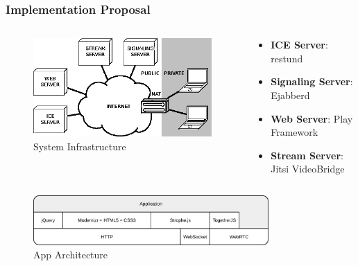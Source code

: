 \documentclass[compress]{beamer}
\begin{document}
		\begin{frame}[c]
		\frametitle{Implementation Proposal}


\begin{columns}[c]
\begin{column}{.4\textwidth}
		\begin{figure}[H]
			\includegraphics[width=\textwidth]{figures/arch.png}
			\caption{System Infrastructure}
		\end{figure}
\end{column}
\begin{column}{.6\textwidth}

\begin{itemize}
\small
		\item \textbf{ICE Server}: restund
		\vfill
		\item \textbf{Signaling Server}: Ejabberd
		\vfill
		\item \textbf{Web Server}: Play Framework
		\vfill
		\item \textbf{Stream Server}: Jitsi VideoBridge
		\end{itemize}

\end{column}
\end{columns}



{
		\centering
		\begin{figure}[H]
			\includegraphics[width=0.8\textwidth]{figures/apparch.png}
			\caption{App Architecture}
		\end{figure}
}

		\end{frame}
\end{document}

